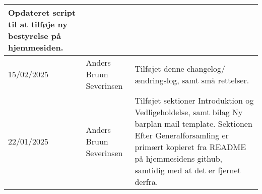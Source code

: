 \begin{tabular}{l l l}
\begin{minipage}[t]
        {0.5\linewidth}
        Opdateret script til at tilføje ny bestyrelse på hjemmesiden.
    \end{minipage} \\
    \hline
    \begin{minipage}[t]
        {0.15\linewidth}
        15/02/2025
    \end{minipage} &
    \begin{minipage}[t]
        {0.35\linewidth}
        Anders Bruun Severinsen
    \end{minipage} & 
    \begin{minipage}[t]
        {0.5\linewidth}
        Tilføjet denne changelog/ændringslog, samt små rettelser.
    \end{minipage} \\
    \hline
    \begin{minipage}[t]
        {0.15\linewidth}
        22/01/2025
    \end{minipage} &
    \begin{minipage}[t]
        {0.35\linewidth}
        Anders Bruun Severinsen
    \end{minipage} & 
    \begin{minipage}[t]
        {0.5\linewidth}
        Tilføjet sektioner Introduktion og Vedligeholdelse, samt bilag Ny barplan mail template.
        Sektionen Efter Generalforsamling er primært kopieret fra README på hjemmesidens 
        github, samtidig med at det er fjernet derfra.
    \end{minipage} \\
    \hline
\end{tabular}
